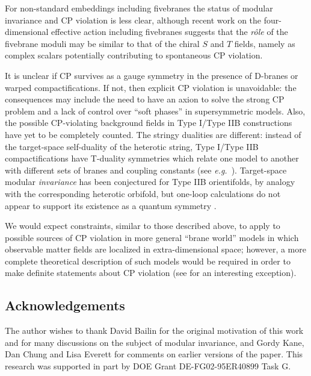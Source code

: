 \documentclass[a4paper,12pt]{article}
\begin{document}
For non-standard embeddings including fivebranes the status of modular invariance and CP violation is less clear, although recent work on the four-dimensional effective action including fivebranes \cite{DerendingerS} suggests that the {\em r\^ole}\/ of the fivebrane moduli may be similar to that of the chiral $S$ and $T$ fields, namely as complex scalars potentially contributing to spontaneous CP violation.

It is unclear if CP survives as a gauge symmetry in the presence of D-branes or warped compactifications. If not, then explicit CP violation is unavoidable: the consequences may include the need to have an axion to solve the strong CP problem and a lack of control over ``soft phases'' in supersymmetric models. Also, the possible CP-violating background fields in Type I/Type IIB constructions have yet to be completely counted. The stringy dualities are different: instead of the target-space self-duality of the heterotic string, Type I/Type IIB compactifications have T-duality symmetries which relate one model to another with different sets of branes and coupling constants (see {\em e.g.\/}\ \cite{Ibanez:1999rf}). Target-space modular {\em invariance}\/ has been conjectured for Type IIB orientifolds, by analogy with the corresponding heterotic orbifold, but one-loop calculations do not appear to support its existence as a quantum symmetry \cite{Lalak:2000ex}. 

We would expect constraints, similar to those described above, to apply to possible sources of CP violation in more general ``brane world'' models in which observable matter fields are localized in extra-dimensional space; however, a more complete theoretical description of such models would be required in order to make definite statements about CP violation (see \cite{Sakamura:2000ik} for an interesting exception).

\subsection*{Acknowledgements}
The author wishes to thank David Bailin for the original motivation of this work and for many discussions on the subject of modular invariance, and Gordy Kane, Dan Chung and Lisa Everett for comments on earlier versions of the paper. This research was supported in part by DOE Grant DE-FG02-95ER40899 Task G.
\end{document}
